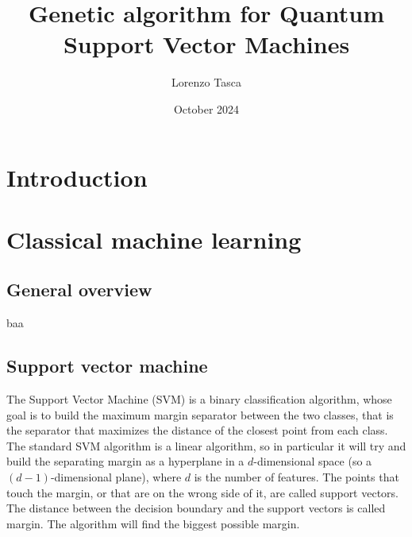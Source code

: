 \documentclass[12pt]{article}
\title{Genetic algorithm for Quantum Support Vector Machines}
\author{Lorenzo Tasca}
\date{October 2024}
\begin{document}
\maketitle
\tableofcontents

\newpage


\section{Introduction}


\section{Classical machine learning}

\subsection{General overview}
baa
\subsection{Support vector machine}



The Support Vector Machine (SVM) is a binary classification algorithm, whose goal is to build the maximum margin separator between the two classes, that is the separator that maximizes the distance of the closest point from each class. The standard SVM algorithm is a linear algorithm, so in particular it will try and build the separating margin as a hyperplane in a $d$-dimensional space (so a $(d-1)$-dimensional plane), where $d$ is the number of features. The points that touch the margin, or that are on the wrong side of it, are called support vectors. The distance between the decision boundary and the support vectors is called margin. The algorithm will find the biggest possible margin. 
\end{document}
